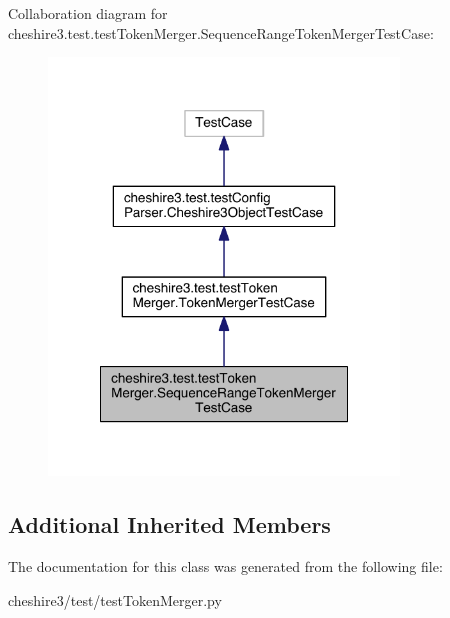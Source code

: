 Collaboration diagram for cheshire3.\-test.\-test\-Token\-Merger.\-Sequence\-Range\-Token\-Merger\-Test\-Case\-:
\nopagebreak
\begin{figure}[H]
\begin{center}
\leavevmode
\includegraphics[width=264pt]{classcheshire3_1_1test_1_1test_token_merger_1_1_sequence_range_token_merger_test_case__coll__graph}
\end{center}
\end{figure}
\subsection*{Additional Inherited Members}


The documentation for this class was generated from the following file\-:\begin{DoxyCompactItemize}
\item 
cheshire3/test/test\-Token\-Merger.\-py\end{DoxyCompactItemize}
